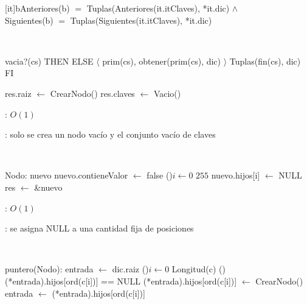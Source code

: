 \begin{Representacion}

	[it]{b}{Anteriores(b) $=$ Tuplas(Anteriores(it.itClaves), *it.dic) $\land$ \\ Siguientes(b) $=$ Tuplas(Siguientes(it.itClaves), *it.dic)}

	~


	{\IF vacia?(cs) THEN
		\secuvacia
	ELSE
		$\langle$ prim(cs), obtener(prim(cs), dic) $\rangle$ \puntito Tuplas(fin(cs), dic)
	FI}


\end{Representacion}

\begin{Algoritmos}


	\begin{algorithm}[H]
		\NoCaptionOfAlgo
		\caption{}
		res.raiz $\leftarrow$ CrearNodo() 
		res.claves $\leftarrow$ Vacio() 
	\end{algorithm}

	\complejidad: $O(1)$

	\justifcomp: solo se crea un nodo vacío y el conjunto vacío de claves

	~

	\begin{algorithm}[H]
		\NoCaptionOfAlgo
		\caption{}
		Nodo: nuevo 
		nuevo.contieneValor $\leftarrow$ false 
		\For(){$i \leftarrow 0$ \KwTo $255$}{ 
			nuevo.hijos[i] $\leftarrow$ NULL 
		}
		res $\leftarrow$ \&nuevo 
	\end{algorithm}

	\complejidad: $O(1)$

	\justifcomp: se asigna NULL a una cantidad fija de posiciones

	~

	\begin{algorithm}[H]
		\NoCaptionOfAlgo
		\caption{}
		puntero(Nodo): entrada $\leftarrow$ dic.raiz 
		\For(){$i \leftarrow 0$ \KwTo Longitud(c)}{
			\If(){(*entrada).hijos[ord(c[i])] == NULL} {
				(*entrada).hijos[ord(c[i])] $\leftarrow$ CrearNodo() 
			}
			entrada $\leftarrow$ (*entrada).hijos[ord(c[i])] 
		}


\end{algorithm}
\end{Algoritmos}
